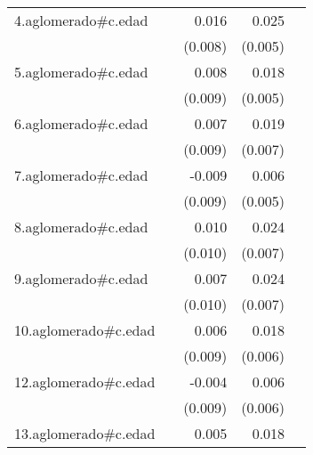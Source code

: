{\begin{longtable}{l*{4}{D{.}{.}{-1}}}
\addlinespace
4.aglomerado#c.edad&                     &       0.016\sym{*}  &       0.025\sym{***}&                     \\
            &                     &     (0.008)         &     (0.005)         &                     \\
\addlinespace
5.aglomerado#c.edad&                     &       0.008         &       0.018\sym{***}&                     \\
            &                     &     (0.009)         &     (0.005)         &                     \\
\addlinespace
6.aglomerado#c.edad&                     &       0.007         &       0.019\sym{**} &                     \\
            &                     &     (0.009)         &     (0.007)         &                     \\
\addlinespace
7.aglomerado#c.edad&                     &      -0.009         &       0.006         &                     \\
            &                     &     (0.009)         &     (0.005)         &                     \\
\addlinespace
8.aglomerado#c.edad&                     &       0.010         &       0.024\sym{***}&                     \\
            &                     &     (0.010)         &     (0.007)         &                     \\
\addlinespace
9.aglomerado#c.edad&                     &       0.007         &       0.024\sym{***}&                     \\
            &                     &     (0.010)         &     (0.007)         &                     \\
\addlinespace
10.aglomerado#c.edad&                     &       0.006         &       0.018\sym{**} &                     \\
            &                     &     (0.009)         &     (0.006)         &                     \\
\addlinespace
12.aglomerado#c.edad&                     &      -0.004         &       0.006         &                     \\
            &                     &     (0.009)         &     (0.006)         &                     \\
\addlinespace
13.aglomerado#c.edad&                     &       0.005         &       0.018\sym{***}&                     \\

\end{longtable}}

